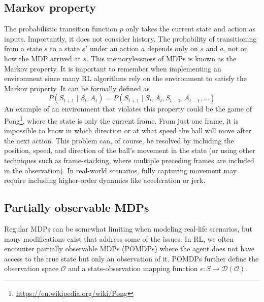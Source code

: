 \documentclass[
  digital,     %
  oneside,     %
  nosansbold,  %
  nocolorbold, %
  lof,         %
  lot,         %
]{fithesis4}
\begin{document}
\subsection{Markov property}
\label{subsec:markov_property}
The probabilistic transition function $p$ only takes the current state and action as inputs. Importantly, it does not consider history. The probability of transitioning from a state $s$ to a state $s'$ under an action $a$ depends only on $s$ and $a$, not on how the MDP arrived at $s$. This memorylessness of MDPs is known as the Markov property. It is important to remember when implementing an environment since many RL algorithms rely on the environment to satisfy the Markov property. It can be formally defined as
\begin{equation}
P(S_{t+1}\mid S_t,A_t)=P(S_{t+1}\mid S_t,A_t,S_{t-1},A_{t-1}, \dotsc)
\end{equation}
An example of an environment that violates this property could be the game of Pong\footnote{\url{https://en.wikipedia.org/wiki/Pong}}, where the state is only the current frame. From just one frame, it is impossible to know in which direction or at what speed the ball will move after the next action. This problem can, of course, be resolved by including the position, speed, and direction of the ball's movement in the state (or using other techniques such as frame-stacking, where multiple preceding frames are included in the observation). In real-world scenarios, fully capturing movement may require including higher-order dynamics like acceleration or jerk.

\subsection{Partially observable MDPs}
Regular MDPs can be somewhat limiting when modeling real-life scenarios, but many modifications exist that address some of the issues. In RL, we often encounter partially observable MDPs (POMDPs) where the agent does not have access to the true state but only an observation of it. POMDPs further define the observation space $\mathcal{O}$ and a state-observation mapping function $\epsilon \colon S \to \mathcal{D}(\mathcal{O})$.
\end{document}
